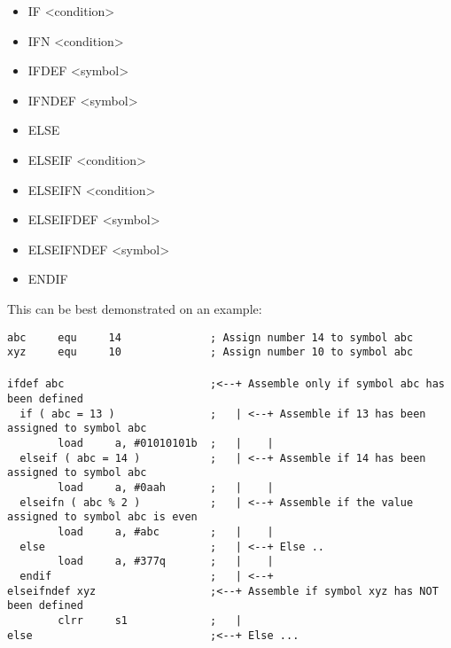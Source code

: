 \begin{itemize}
    \item IF <condition>
    \item IFN <condition>
    \item IFDEF <symbol>
    \item IFNDEF <symbol>
    \item ELSE
    \item ELSEIF <condition>
    \item ELSEIFN <condition>
    \item ELSEIFDEF <symbol>
    \item ELSEIFNDEF <symbol>
    \item ENDIF
\end{itemize}

This can be best demonstrated on an example:
\begin{code}[h!]
    \mysmallfont{}
    \verb'abc     equ     14              ; Assign number 14 to symbol abc'\\
    \verb'xyz     equ     10              ; Assign number 10 to symbol abc'\\
    \verb''\\
    \verb'ifdef abc                       ;<--+ Assemble only if symbol abc has been defined'\\
    \verb'  if ( abc = 13 )               ;   | <--+ Assemble if 13 has been assigned to symbol abc'\\
    \verb'        load     a, #01010101b  ;   |    |'\\
    \verb'  elseif ( abc = 14 )           ;   | <--+ Assemble if 14 has been assigned to symbol abc'\\
    \verb'        load     a, #0aah       ;   |    |'\\
    \verb'  elseifn ( abc % 2 )           ;   | <--+ Assemble if the value assigned to symbol abc is even'\\
    \verb'        load     a, #abc        ;   |    |'\\
    \verb'  else                          ;   | <--+ Else ..'\\
    \verb'        load     a, #377q       ;   |    |'\\
    \verb'  endif                         ;   | <--+'\\
    \verb'elseifndef xyz                  ;<--+ Assemble if symbol xyz has NOT been defined'\\
    \verb'        clrr     s1             ;   |'\\
    \verb'else                            ;<--+ Else ...'\\

\end{code}
